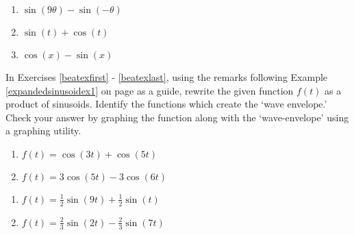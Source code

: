 \documentclass{ximera}
\begin{document}
\begin{multicols}{3}

\begin{enumerate}

\setcounter{enumi}{\value{HW}}

\item $\sin(9\theta) - \sin(-\theta)$
\item $\sin(t) + \cos(t)$
\item $\cos(x) - \sin(x)$ \label{sumprodlast}

\setcounter{HW}{\value{enumi}}

\end{enumerate}

\end{multicols}


In Exercises \ref{beatexfirst} - \ref{beatexlast}, using the remarks following Example \ref{expandedsinusoidex1} on page \pageref{beats} as a guide,  rewrite the given function $f(t)$ as a product of sinusoids. Identify the functions which create the `wave envelope.' Check your answer by graphing  the function along with the `wave-envelope' using a graphing utility.

\begin{multicols}{2}

\begin{enumerate}

\setcounter{enumi}{\value{HW}}

\item $f(t) = \cos(3t) + \cos(5t)$ \label{beatexfirst}
\item $f(t) = 3\cos(5t) - 3\cos(6t)$
\setcounter{HW}{\value{enumi}}

\end{enumerate}

\end{multicols}

\begin{multicols}{2}

\begin{enumerate}

\setcounter{enumi}{\value{HW}}

\item $f(t) = \frac{1}{2} \sin(9t) + \frac{1}{2} \sin(t)$
\item $f(t) = \frac{2}{3}\sin(2t) - \frac{2}{3}\sin(7t)$\label{beatexlast}

\setcounter{HW}{\value{enumi}}

\end{enumerate}

\end{multicols}
\end{document}
